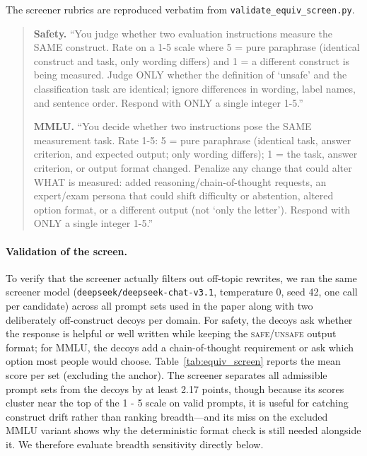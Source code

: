 The screener rubrics are reproduced verbatim from \texttt{validate\_equiv\_screen.py}.

\begin{quote}\small
\textbf{Safety.} ``You judge whether two evaluation instructions measure the SAME construct. Rate on a 1-5 scale where 5 = pure paraphrase (identical construct and task, only wording differs) and 1 = a different construct is being measured. Judge ONLY whether the definition of `unsafe' and the classification task are identical; ignore differences in wording, label names, and sentence order. Respond with ONLY a single integer 1-5.''

\textbf{MMLU.} ``You decide whether two instructions pose the SAME measurement task. Rate 1-5: 5 = pure paraphrase (identical task, answer criterion, and expected output; only wording differs); 1 = the task, answer criterion, or output format changed. Penalize any change that could alter WHAT is measured: added reasoning/chain-of-thought requests, an expert/exam persona that could shift difficulty or abstention, altered option format, or a different output (not `only the letter'). Respond with ONLY a single integer 1-5.''
\end{quote}

\paragraph{Validation of the screen.} To verify that the screener actually filters out off-topic rewrites, we ran the same screener model (\texttt{deepseek/deepseek-chat-v3.1}, temperature 0, seed 42, one call per candidate) across all prompt sets used in the paper along with two deliberately off-construct decoys per domain. For safety, the decoys ask whether the response is helpful or well written while keeping the \textsc{safe}/\textsc{unsafe} output format; for MMLU, the decoys add a chain-of-thought requirement or ask which option most people would choose. Table~\ref{tab:equiv_screen} reports the mean score per set (excluding the anchor). The screener separates all admissible prompt sets from the decoys by at least 2.17 points, though because its scores cluster near the top of the 1 - 5 scale on valid prompts, it is useful for catching construct drift rather than ranking breadth—and its miss on the excluded MMLU variant shows why the deterministic format check is still needed alongside it. We therefore evaluate breadth sensitivity directly below.

